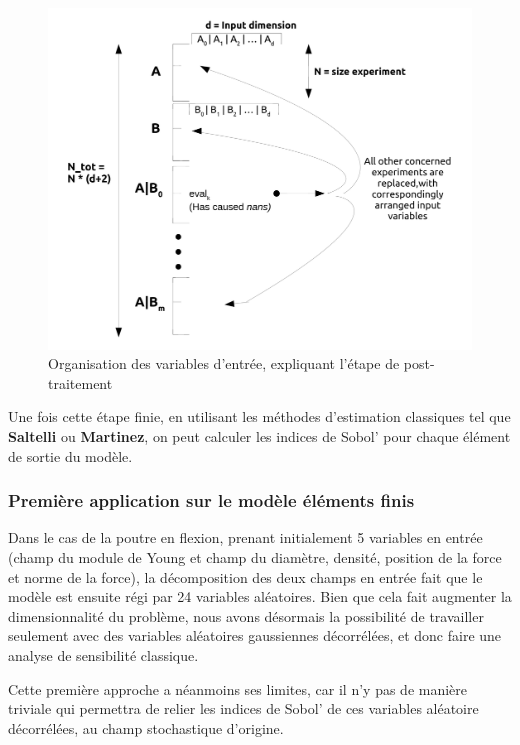 \documentclass[a4paper,10pt]{article}
\begin{document}
\begin{figure}[H]
   \centering   
   \includegraphics[width=\linewidth]{schema_postprocessing.png}
      \caption{Organisation des variables d'entrée, expliquant l'étape de post-traitement }
         \label{posprocessing}
\end{figure}


Une fois cette étape finie, en utilisant les méthodes d'estimation classiques tel que \textbf{Saltelli} ou \textbf{Martinez}, on peut calculer les indices de Sobol' pour chaque élément de sortie du modèle. 

\subsubsection{Première application sur le modèle éléments finis}

Dans le cas de la poutre en flexion, prenant initialement 5 variables en entrée (champ du module de Young et champ du diamètre, densité, position de la force et norme de la force), la décomposition des deux champs en entrée fait que le modèle est ensuite régi par 24 variables aléatoires. Bien que cela fait augmenter la dimensionnalité du problème, nous avons désormais la possibilité de travailler seulement avec des variables aléatoires gaussiennes décorrélées, et donc faire une analyse de sensibilité classique. \smallskip

Cette première approche a néanmoins ses limites, car il n'y pas de manière triviale qui permettra de relier les indices de Sobol’ de ces variables aléatoire décorrélées, au champ stochastique d'origine. \\
\end{document}
